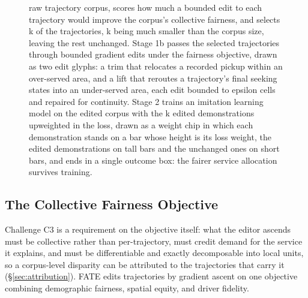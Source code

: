 \begin{figure}[t]
{  raw trajectory corpus, scores how much a bounded edit to each trajectory
  would improve the corpus's collective fairness, and selects k of the
  trajectories, k being much smaller than the corpus size, leaving the rest
  unchanged. Stage 1b passes the selected trajectories through bounded
  gradient edits under the fairness objective, drawn as two edit glyphs: a
  trim that relocates a recorded pickup within an over-served area, and a lift
  that reroutes a trajectory's final seeking states into an under-served area,
  each edit bounded to epsilon cells and repaired for continuity. Stage 2
  trains an imitation learning model on the edited corpus with the k edited
  demonstrations upweighted in the loss, drawn as a weight chip in which each
  demonstration stands on a bar whose height is its loss weight, the edited
  demonstrations on tall bars and the unchanged ones on short bars, and ends
  in a single outcome box: the fairer service allocation survives training.}
  \label{fig:overview}
\end{figure}

\subsection{The Collective Fairness Objective}\label{sec:objective}

Challenge C3 is a requirement on the objective itself: what the editor ascends
must be collective rather than per-trajectory, must credit demand for the
service it explains, and must be differentiable and exactly decomposable into
local units, so a corpus-level disparity can be attributed to the trajectories
that carry it (\S\ref{sec:attribution}). FATE edits trajectories by gradient
ascent on one objective combining demographic fairness, spatial equity, and
driver fidelity.

